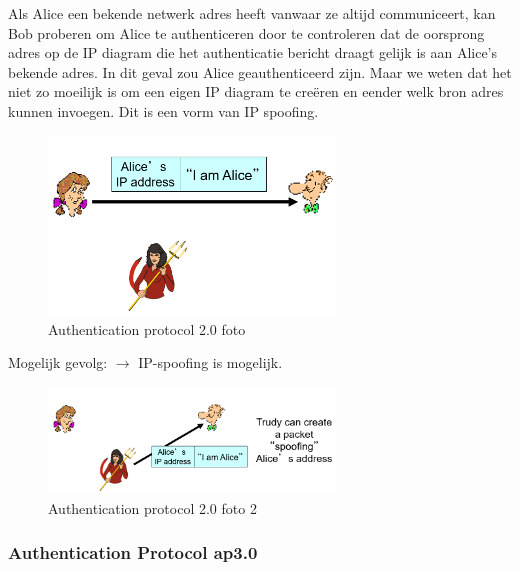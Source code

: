 \noindent Als Alice een bekende netwerk adres heeft vanwaar ze altijd communiceert, kan Bob proberen om Alice te authenticeren door te controleren dat de oorsprong adres op de IP diagram die het authenticatie bericht draagt gelijk is aan Alice’s bekende adres. In dit geval zou Alice geauthenticeerd zijn.
Maar we weten dat het niet zo moeilijk is om een eigen IP diagram te creëren en eender welk bron adres kunnen invoegen. Dit is een vorm van IP spoofing.
\begin{figure}[h]
    \centering
    \includegraphics[width=3in]{./img/imghfdst8/hfdst8puntje14.png}
    \caption{Authentication protocol 2.0 foto  }     
    \label{fig:Authentication protocol 2.0 foto 1}
\end{figure}

\noindent Mogelijk gevolg: $\rightarrow$ IP-spoofing is mogelijk.

\begin{figure}[h]
    \centering
    \includegraphics[width=3in]{./img/imghfdst8/hfdst8puntje15.png}
    \caption{Authentication protocol 2.0 foto 2}      
    \label{fig:Authentication protocol 2.0 foto 2}
\end{figure}

\newpage

\subsubsection{Authentication Protocol ap3.0}

